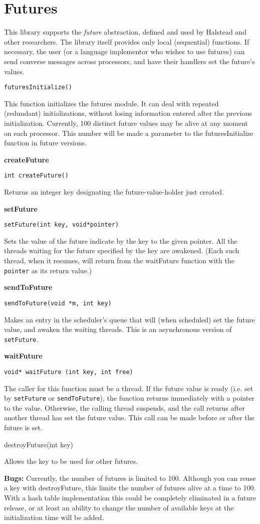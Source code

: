 \chapter{Futures}

This library supports the {\em future} abstraction, defined and used by
Halstead and other researchers. The library itself provides only
local (sequential) functions. If necessary, the user (or a language
implementor who wishes to use futures) can send converse messages
across processors, and have their handlers set the future's values.

\verb#futuresInitialize()#

This function initializes the futures module. It can deal with
repeated (redundant) initializations, without losing information
entered after the previous initialization. Currently, 100 distinct
future values may be alive at any moment on each processor. This
number will be made a parameter to the futuresInitialize function in
future versions.

{\large \bf createFuture}

\verb#int createFuture()#

Returns an integer key designating the future-value-holder just
created.


{\large \bf setFuture}

\verb#setFuture(int key, void*pointer)#

Sets the value of the future indicate by the key to the given pointer.
All the threads waiting for the future specified by the key are
awakened. (Each such thread, when it resumes, will return from the
waitFuture function with the \verb#pointer# as its return value.)

{\large \bf sendToFuture}

\verb#sendToFuture(void *m, int key)#

Makes an entry in the scheduler's queue that will (when scheduled) set
the future value, and awaken the waiting threads. This is an
asynchronous version of \verb#setFuture#. 


{\large \bf  waitFuture}

\verb#void* waitFuture (int key, int free)#

The caller for this function must be a thread. If the future value is
ready (i.e. set by \verb#setFuture# or \verb#sendToFuture#), the
function returns immediately with a pointer to the value. Otherwise,
the calling thread suspends, and the call returns after another thread
has set the future value. This call can be made before or after the future
is set.

destroyFuture(int key)

Allows  the key to be used for other futures.

{\large \bf Bugs:} Currently, the number of futures is limited to 100.
Although you can reuse a key with destroyFuture, this limits the
number of futures alive at a time to 100. With a hash table
implementation this could be completely eliminated in a future
release, or at least an ability to change the number of available keys
at the initialization time will be added.

